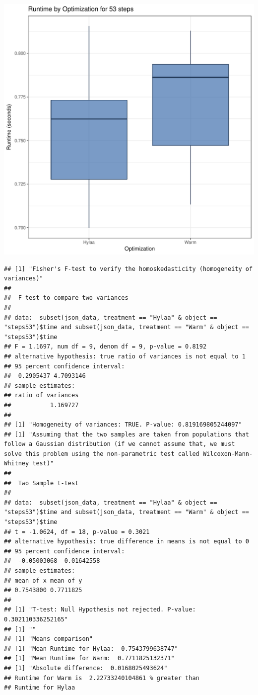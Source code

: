 \documentclass{article}\usepackage[]{graphicx}\usepackage[]{color}
\makeatletter
\def\maxwidth{ %
  \ifdim\Gin@nat@width>\linewidth
    \linewidth
  \else
    \Gin@nat@width
  \fi
}
\newenvironment{kframe}{%
 \def\at@end@of@kframe{}%
 \ifinner\ifhmode%
  \def\at@end@of@kframe{\end{minipage}}%
  \begin{minipage}{\columnwidth}%
 \fi\fi%
 \def\FrameCommand##1{\hskip\@totalleftmargin \hskip-\fboxsep
 \colorbox{shadecolor}{##1}\hskip-\fboxsep
     \hskip-\linewidth \hskip-\@totalleftmargin \hskip\columnwidth}%
 \MakeFramed {\advance\hsize-\width
   \@totalleftmargin\z@ \linewidth\hsize
   \@setminipage}}%
 {\par\unskip\endMakeFramed%
 \at@end@of@kframe}
\newenvironment{knitrout}{}{} %
\makeatother
\begin{document}
\begin{knitrout}
\color{fgcolor}
\includegraphics[width=\maxwidth]{figure/RH1_steps53-1} 
\begin{kframe}\begin{verbatim}
## [1] "Fisher's F-test to verify the homoskedasticity (homogeneity of variances)"
## 
## 	F test to compare two variances
## 
## data:  subset(json_data, treatment == "Hylaa" & object == "steps53")$time and subset(json_data, treatment == "Warm" & object == "steps53")$time
## F = 1.1697, num df = 9, denom df = 9, p-value = 0.8192
## alternative hypothesis: true ratio of variances is not equal to 1
## 95 percent confidence interval:
##  0.2905437 4.7093146
## sample estimates:
## ratio of variances 
##           1.169727 
## 
## [1] "Homogeneity of variances: TRUE. P-value: 0.819169805244097"
## [1] "Assuming that the two samples are taken from populations that follow a Gaussian distribution (if we cannot assume that, we must solve this problem using the non-parametric test called Wilcoxon-Mann-Whitney test)"
## 
## 	Two Sample t-test
## 
## data:  subset(json_data, treatment == "Hylaa" & object == "steps53")$time and subset(json_data, treatment == "Warm" & object == "steps53")$time
## t = -1.0624, df = 18, p-value = 0.3021
## alternative hypothesis: true difference in means is not equal to 0
## 95 percent confidence interval:
##  -0.05003068  0.01642558
## sample estimates:
## mean of x mean of y 
## 0.7543800 0.7711825 
## 
## [1] "T-test: Null Hypothesis not rejected. P-value: 0.302110336252165"
## [1] ""
## [1] "Means comparison"
## [1] "Mean Runtime for Hylaa:  0.7543799638747"
## [1] "Mean Runtime for Warm:  0.7711825132371"
## [1] "Absolute difference:  0.0168025493624"
## Runtime for Warm is  2.22733240104861 % greater than 
## Runtime for Hylaa
\end{verbatim}
\end{kframe}
\end{knitrout}
\end{document}
